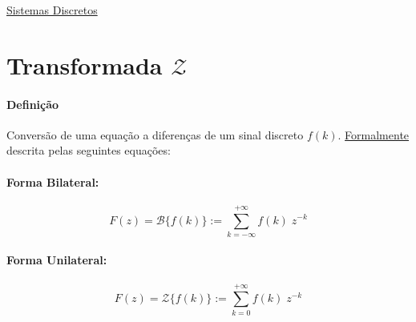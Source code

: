 \documentclass{article}
\begin{document}
\href{https://www.mathworks.com/matlabcentral/answers/55210-discrete-system-solving-with-matlab}{Sistemas Discretos}


\section{Transformada $\mathcal{Z}$}
    \paragraph{Definição}Conversão de uma equação a diferenças de um sinal discreto $f(k)$. \href{https://en.wikipedia.org/wiki/Z-transform}{Formalmente} descrita pelas seguintes equações:
    \begin{multicols}{2}
        \raggedcolumns
        \paragraph{Forma Bilateral:}
        \begin{equation}
            \boxed{
                F(z) = \mathcal{B} \{ f(k) \} := \sum_{k=-\infty}^{+\infty} f(k) \; z^{-k}
            }
        \end{equation}
        \columnbreak
        \paragraph{Forma Unilateral:}
        \begin{equation}
            \boxed{
                F(z) = \mathcal{Z}\{ f(k) \} := \sum_{k=0}^{+\infty} f(k) \; z^{-k}
            }
        \end{equation}
    \end{multicols}\noindent
\end{document}

